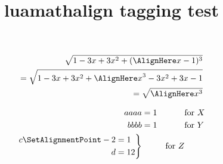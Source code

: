 \documentclass{article}
\title{luamathalign tagging test}
\begin{document}
\begin{align*}
\sqrt{1-3x+3x^2+(\AlignHere x-1)^3}\\
=\sqrt{1-3x+3x^2+{\AlignHere x}^3-3x^2+3x-1}\\
=\sqrt{\AlignHere x^3}
\end{align*}

\begin{align}
aaaa &= 1 &&\text{for $X$} \\
bbbb &= 1 &&\text{for $Y$} \\
\left. \begin{aligned}
c \SetAlignmentPoint-2 &= 1 \\
d &= 12
\end{aligned} \right\}&&\text{for $Z$}
\end{align}
\end{document}
